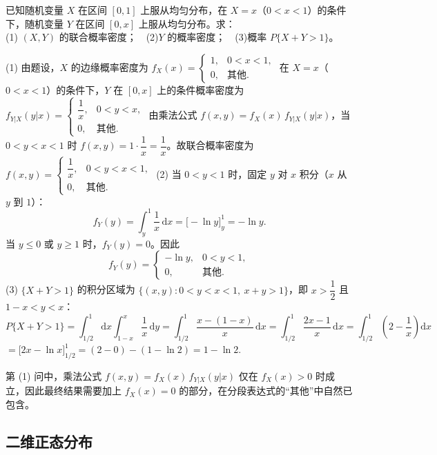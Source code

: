 \documentclass[lang=cn,11pt]{elegantbook}
\begin{document}
\begin{exercise}[条件均匀分布] \label{exer:3-14}
已知随机变量 $X$ 在区间 $[0,1]$ 上服从均匀分布，在 $X=x$（$0<x<1$）的条件下，随机变量 $Y$ 在区间 $[0,x]$ 上服从均匀分布。求：\\
(1) $(X,Y)$ 的联合概率密度；~~(2)$Y$ 的概率密度；~~(3)概率 $P\{X+Y>1\}$。
\end{exercise}
\begin{solution}
(1) 由题设，$X$ 的边缘概率密度为
\(
f_X(x) = \begin{cases} 1, & 0 < x < 1, \\ 0, & \text{其他}. \end{cases}
\)
在 $X=x$（$0<x<1$）的条件下，$Y$ 在 $[0,x]$ 上的条件概率密度为
\(
f_{Y|X}(y|x) = \begin{cases} \dfrac{1}{x}, & 0 < y < x, \\ 0, & \text{其他}. \end{cases}
\)
由乘法公式 $f(x,y) = f_X(x)\,f_{Y|X}(y|x)$，当 $0<y<x<1$ 时 $f(x,y) = 1\cdot\dfrac{1}{x} = \dfrac{1}{x}$。故联合概率密度为
\(
f(x,y) = \begin{cases} \dfrac{1}{x}, & 0 < y < x < 1, \\ 0, & \text{其他}. \end{cases}
\)
(2) 当 $0<y<1$ 时，固定 $y$ 对 $x$ 积分（$x$ 从 $y$ 到 $1$）：
\[
f_Y(y) = \int_y^1\frac{1}{x}\,\mathrm{d}x = \bigl[-\ln y\bigr]_y^1 = -\ln y.
\]
当 $y \leqslant 0$ 或 $y \geqslant 1$ 时，$f_Y(y) = 0$。因此
\[
f_Y(y) = \begin{cases} -\ln y, & 0 < y < 1, \\ 0, & \text{其他}. \end{cases}
\]
(3) $\{X+Y>1\}$ 的积分区域为 $\{(x,y): 0<y<x<1,\ x+y>1\}$，即 $x>\dfrac{1}{2}$ 且 $1-x<y<x$：
\[
P\{X+Y>1\} = \int_{1/2}^1\mathrm{d}x\int_{1-x}^x\frac{1}{x}\,\mathrm{d}y = \int_{1/2}^1\frac{x-(1-x)}{x}\,\mathrm{d}x = \int_{1/2}^1\frac{2x-1}{x}\,\mathrm{d}x = \int_{1/2}^1\left(2-\frac{1}{x}\right)\mathrm{d}x
\]
\(
= \bigl[2x - \ln x\bigr]_{1/2}^1 = (2-0) - (1-\ln 2) = 1 - \ln 2.
\)
\end{solution}
\begin{note}
第 (1) 问中，乘法公式 $f(x,y) = f_X(x)\,f_{Y|X}(y|x)$ 仅在 $f_X(x)>0$ 时成立，因此最终结果需要加上 $f_X(x)=0$ 的部分，在分段表达式的``其他''中自然已包含。
\end{note}


\subsection{二维正态分布}
\end{document}
